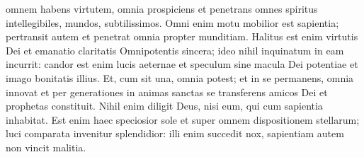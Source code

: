 \begin{biblechapter}
\begin{biblechapter}
\begin{biblechapter}
\begin{biblechapter}
\begin{biblechapter}
\begin{biblechapter}
\begin{biblechapter}
 omnem habens virtutem, omnia prospiciens
 et penetrans omnes spiritus
 intellegibiles, mundos, subtilissimos.
 \verse Omni enim motu mobilior est sapientia;
 pertransit autem et penetrat omnia propter munditiam.
 \verse Halitus est enim virtutis Dei
 et emanatio claritatis Omnipotentis sincera;
 ideo nihil inquinatum in eam incurrit:
 \verse candor est enim lucis aeternae
 et speculum sine macula Dei potentiae
 et imago bonitatis illius.
 \verse Et, cum sit una, omnia potest;
 et in se permanens, omnia innovat
 et per generationes in animas sanctas se transferens
 amicos Dei et prophetas constituit.
 \verse Nihil enim diligit Deus,
 nisi eum, qui cum sapientia inhabitat.
 \verse Est enim haec speciosior sole
 et super omnem dispositionem stellarum;
 luci comparata invenitur splendidior:
 \verse illi enim succedit nox,
 sapientiam autem non vincit malitia.
 

\end{biblechapter}
\end{biblechapter}
\end{biblechapter}
\end{biblechapter}
\end{biblechapter}
\end{biblechapter}
\end{biblechapter}
